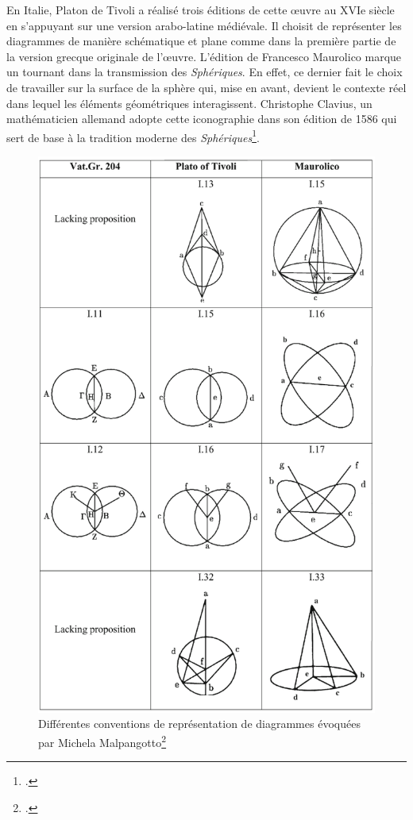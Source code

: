 En Italie, Platon de Tivoli a réalisé trois éditions de cette œuvre au XVIe siècle en s'appuyant sur une version arabo-latine médiévale. Il choisit de représenter les diagrammes de manière schématique et plane comme dans la première partie de la version grecque originale de l'œuvre. L'édition de Francesco Maurolico marque un tournant dans la transmission des \textit{Sphériques}. En effet, ce dernier fait le choix de travailler sur la surface de la sphère qui, mise en avant, devient le contexte réel dans lequel les éléments géométriques interagissent. Christophe Clavius, un mathématicien allemand adopte cette iconographie dans son édition de 1586 qui sert de base à la tradition moderne des \textit{Sphériques}\footcite{malpangottoGraphicalChoicesGeometrical2010}. 

\begin{figure}[h]
	\centering
	\includegraphics[width=0.9\linewidth]{images/conventions_diagrammes.png}
	\caption{Différentes conventions de représentation de diagrammes évoquées par Michela Malpangotto\footcite{malpangottoGraphicalChoicesGeometrical2010}}
	\label{fig:conventions}
\end{figure}


